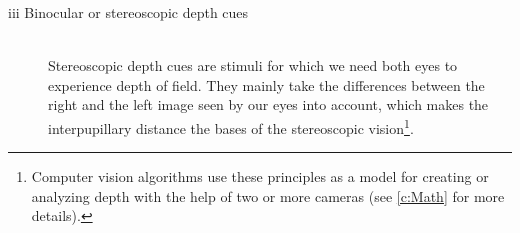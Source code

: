 \begin{description}
\item [iii Binocular or stereoscopic depth cues]\hfill \\ Stereoscopic depth cues are stimuli for which we need both eyes to experience depth of field. They mainly take the differences between the right and the left image seen by our eyes into account, which makes the interpupillary distance the bases of the stereoscopic vision\footnote{Computer vision algorithms use these principles as a model for creating or analyzing depth with the help of two or more cameras (see \autoref{c:Math} for more details).}.
\end{description}
